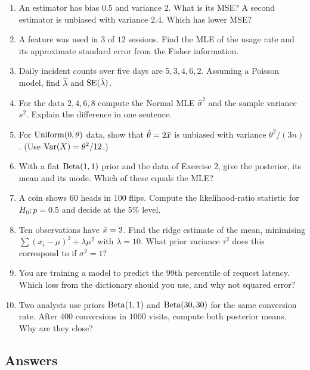 \begin{enumerate}
  \item An estimator has bias $0.5$ and variance $2$. What is its MSE? A second estimator
  is unbiased with variance $2.4$. Which has lower MSE?
  \item A feature was used in $3$ of $12$ sessions. Find the MLE of the usage rate and its
  approximate standard error from the Fisher information.
  \item Daily incident counts over five days are $5, 3, 4, 6, 2$. Assuming a Poisson
  model, find $\hat\lambda$ and $\operatorname{SE}(\hat\lambda)$.
  \item For the data $2, 4, 6, 8$ compute the Normal MLE $\hat\sigma^2$ and the sample
  variance $s^2$. Explain the difference in one sentence.
  \item For $\operatorname{Uniform}(0,\theta)$ data, show that $\hat\theta = 2\bar{x}$ is unbiased with
  variance $\theta^2/(3n)$. (Use $\operatorname{Var}(X) = \theta^2/12$.)
  \item With a flat $\operatorname{Beta}(1,1)$ prior and the data of Exercise 2, give the posterior, its
  mean and its mode. Which of these equals the MLE?
  \item A coin shows $60$ heads in $100$ flips. Compute the likelihood-ratio statistic for
  $H_0\colon p = 0.5$ and decide at the 5\% level.
  \item Ten observations have $\bar{x} = 2$. Find the ridge estimate of the mean,
  minimising $\sum(x_i-\mu)^2 + \lambda\mu^2$ with $\lambda = 10$. What prior variance
  $\tau^2$ does this correspond to if $\sigma^2 = 1$?
  \item You are training a model to predict the 99th percentile of request latency.
  Which loss from the dictionary should you use, and why not squared error?
  \item Two analysts use priors $\operatorname{Beta}(1,1)$ and $\operatorname{Beta}(30,30)$ for the same conversion rate.
  After $400$ conversions in $1000$ visits, compute both posterior means. Why are they
  close?
\end{enumerate}

\subsection*{Answers}

